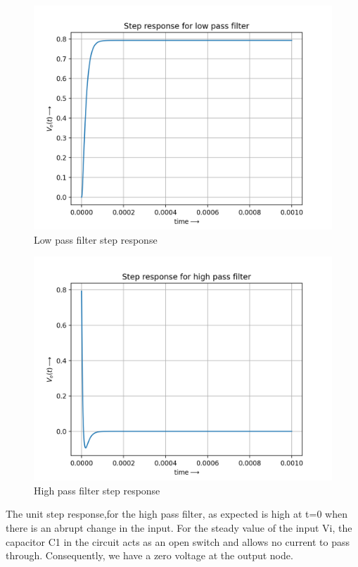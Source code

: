 \documentclass[11pt, a4paper]{article}
\begin{document}
\begin{figure}[!tbh]
   	\centering
   	\includegraphics[scale=0.5]{low_pass_step.png}   
   	\caption{Low pass filter step response}
   	\label{fig:Figure_1}
\end{figure}
\newpage
\begin{figure}[!tbh]
   	\centering
   	\includegraphics[scale=0.5]{high_pass_step.png}   
   	\caption{High pass filter step response}
   	\label{fig:Figure_1}
\end{figure}
The unit step response,for the high pass filter, as expected is high at t=0 when there is an abrupt change in the input.  For the steady value of the input Vi, the capacitor C1 in the circuit acts as an open switch and allows no current to pass through.  Consequently,  we have a zero voltage at the output node.
\end{document}
